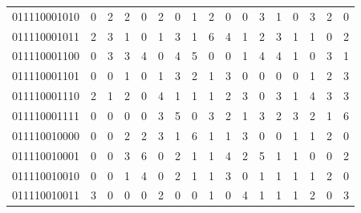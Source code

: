 \documentclass[10pt,a4paper]{article}
\begin{document}
\begin{longtable}{ |c|c|c|c|c|c|c|c|c|c|c|c|c|c|c|c|c| }
    011110001010              & 0                            & 2                                & 2                            & 0                              & 2   & 0   & 1   & 2   & 0   & 0   & 3   & 1   & 0   & 3   & 2   & 0   \\
    011110001011              & 2                            & 3                                & 1                            & 0                              & 1   & 3   & 1   & 6   & 4   & 1   & 2   & 3   & 1   & 1   & 0   & 2   \\
    011110001100              & 0                            & 3                                & 3                            & 4                              & 0   & 4   & 5   & 0   & 0   & 1   & 4   & 4   & 1   & 0   & 3   & 1   \\
    011110001101              & 0                            & 0                                & 1                            & 0                              & 1   & 3   & 2   & 1   & 3   & 0   & 0   & 0   & 0   & 1   & 2   & 3   \\
    011110001110              & 2                            & 1                                & 2                            & 0                              & 4   & 1   & 1   & 1   & 2   & 3   & 0   & 3   & 1   & 4   & 3   & 3   \\
    011110001111              & 0                            & 0                                & 0                            & 0                              & 3   & 5   & 0   & 3   & 2   & 1   & 3   & 2   & 3   & 2   & 1   & 6   \\
    011110010000              & 0                            & 0                                & 2                            & 2                              & 3   & 1   & 6   & 1   & 1   & 3   & 0   & 0   & 1   & 1   & 2   & 0   \\
    011110010001              & 0                            & 0                                & 3                            & 6                              & 0   & 2   & 1   & 1   & 4   & 2   & 5   & 1   & 1   & 0   & 0   & 2   \\
    011110010010              & 0                            & 0                                & 1                            & 4                              & 0   & 2   & 1   & 1   & 3   & 0   & 1   & 1   & 1   & 1   & 2   & 0   \\
    011110010011              & 3                            & 0                                & 0                            & 0                              & 2   & 0   & 0   & 1   & 0   & 4   & 1   & 1   & 1   & 2   & 0   & 3   \\

\end{longtable}
\end{document}
